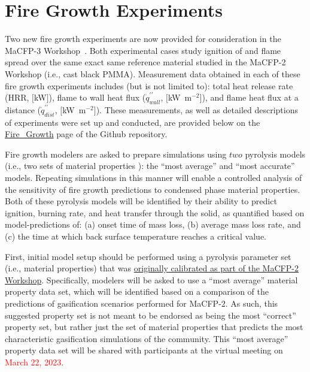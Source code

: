 \documentclass[12pt]{article}
\newcommand{\pp}{\prime\prime}
\begin{document}
\clearpage
\section{Fire Growth Experiments}
\label{Sec:Fire Growth}
Two new fire growth experiments are now provided for consideration in the MaCFP-3 Workshop~\cite{chaudhari2021experimental, Leventon2022ParallelPanel}. Both experimental cases study ignition of and flame spread over the same exact same reference material studied in the MaCFP-2 Workshop (i.e., cast black PMMA). Measurement data obtained in each of these fire growth experiments includes (but is not limited to): total heat release rate (HRR, $[$kW$]$), flame to wall heat flux ($\dot{q}^{\pp}_{wall}$, $[$kW~m$^{-2}$$]$), and flame heat flux at a distance ($\dot{q}^{\pp}_{dist}$, $[$kW~m$^{-2}$$]$). These measurements, as well as detailed descriptions of experiments were set up and conducted, are provided below on the \href{https://github.com/MaCFP/macfp-db/tree/master/Fire_Growth}{Fire\_Growth} page of the Github repository.

Fire growth modelers are asked to prepare simulations using $two$ pyrolysis models (i.e., two sets of material properties ): the ``most average'' and ``most accurate'' models. Repeating simulations in this manner will enable a controlled analysis of the sensitivity of fire growth predictions to condensed phase material properties. Both of these pyrolysis models will be identified by their ability to predict ignition, burning rate, and heat transfer through the solid, as quantified based on model-predictions of: (a) onset time of mass loss, (b) average mass loss rate, and (c) the time at which back surface temperature reaches a critical value.

First, initial model setup should be performed using a pyrolysis parameter set (i.e., material properties) that was \href{https://github.com/MaCFP/matl-db/tree/master/PMMA/Material_Properties}{originally calibrated as part of the MaCFP-2 Workshop}. Specifically, modelers will be asked to use a ``most average'' material property data set, which will be identified based on a comparison of the predictions of gasification scenarios performed for MaCFP-2. As such, this suggested property set is not meant to be endorsed as being the most ``correct'' property set, but rather just the set of material properties that predicts the most characteristic gasification simulations of the community. This ``most average'' property data set will be shared with participants at the virtual meeting on \textcolor{red}{March 22, 2023}.
\end{document}
